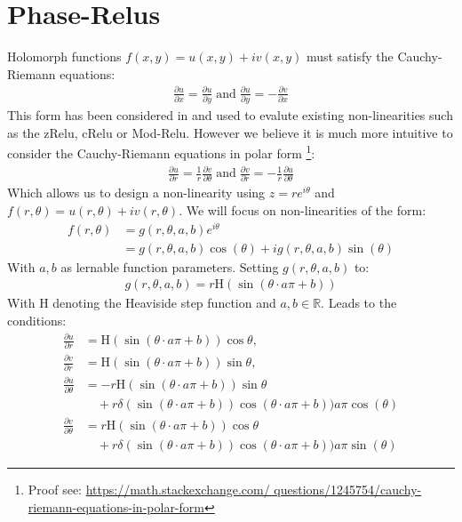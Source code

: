 \documentclass{article}
\begin{document}
\section{Phase-Relus}
Holomorph functions $f(x,y) = u(x,y) + iv(x,y)$ must satisfy the Cauchy-Riemann equations:
\begin{align}
\frac{\partial u}{\partial x} = \frac{\partial u}{\partial y} \; \text{and} \; \frac{\partial u}{\partial y} = -\frac{\partial v}{\partial x}  
\end{align}
This form has been considered in \cite{Trabelsi} and used to evalute existing non-linearities such as the zRelu, cRelu or Mod-Relu. However we believe it is much more intuitive to consider the Cauchy-Riemann equations in polar form \footnote{Proof see: \url{https://math.stackexchange.com/
questions/1245754/cauchy-riemann-equations-in-polar-form}}:
\begin{align}
\frac{\partial u}{\partial r} = \frac{1}{r} \frac{\partial v}{\partial \theta} \; \text{and} \; \frac{\partial v}{\partial r} = - \frac{1}{r} \frac{\partial u}{\partial \theta}
\end{align}
Which allows us to design a non-linearity using $z = re^{i\theta}$ and $f(r,\theta ) = u(r,\theta ) + iv(r,\theta )$. We will focus on non-linearities of the form:
\begin{align}
f(r, \theta) &= g(r,\theta,a,b) e^{i \theta} \\
&= g(r,\theta,a,b)\cos(\theta) + ig(r,\theta,a,b)\sin(\theta)
\end{align}
With $a,b$ as lernable function parameters. Setting $g(r,\theta,a,b)$ to:
\begin{align}
g(r,\theta,a,b) = r \text{H}(\sin (\theta \cdot a\pi + b))
\label{eq:PhaseRelu}
\end{align}
With H denoting the Heaviside step function and $a,b \in \mathbb{R}$. Leads to the conditions:
\begin{align}
\frac{\partial u}{\partial r} &= \text{H}(\sin (\theta \cdot a\pi + b)) \cos \theta, \\ 
\frac{\partial v}{\partial r} &= \text{H}(\sin (\theta \cdot a\pi + b)) \sin \theta, \\
\frac{\partial u}{\partial \theta} &= -r \text{H}(\sin (\theta \cdot a\pi + b)) \sin \theta \nonumber \\
&\quad + r \delta(\sin (\theta \cdot a\pi + b)) \cos(\theta \cdot a\pi + b))a\pi \cos(\theta)\\ 
\frac{\partial v}{\partial \theta} &= r \text{H}(\sin (\theta \cdot a\pi + b)) \cos \theta \nonumber \\
&\quad + r \delta(\sin (\theta \cdot a\pi + b)) \cos(\theta \cdot a\pi + b))a\pi \sin(\theta)
\end{align}
\end{document}
